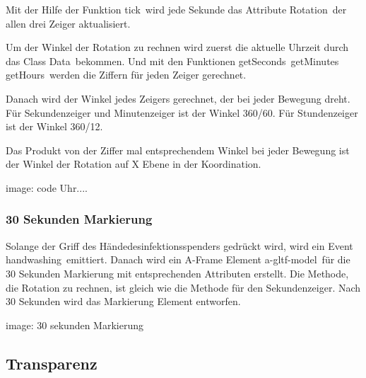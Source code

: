  Mit der Hilfe der Funktion \glqq tick\grqq\ wird jede Sekunde das Attribute \glqq Rotation\grqq\ der allen drei Zeiger aktualisiert. 
 
 Um der Winkel der Rotation zu rechnen wird zuerst die aktuelle Uhrzeit durch das Class \glqq Data\grqq\ bekommen. Und mit den Funktionen \glqq getSeconds\grqq\, \glqq getMinutes\grqq\, \glqq getHours\grqq\ werden die Ziffern für jeden Zeiger gerechnet.
 
 Danach wird der Winkel jedes Zeigers gerechnet, der bei jeder Bewegung dreht. Für Sekundenzeiger und Minutenzeiger ist der Winkel 360/60. Für Stundenzeiger ist der Winkel 360/12.
 
 Das Produkt von der Ziffer mal entsprechendem Winkel bei jeder Bewegung ist der Winkel der Rotation auf X Ebene in der Koordination.
 
 image: code Uhr....
 
 \subsubsection{30 Sekunden Markierung}
 Solange der Griff des Händedesinfektionsspenders gedrückt wird, wird ein Event \glqq handwashing\grqq\ emittiert. Danach wird ein A-Frame Element \glqq a-gltf-model\grqq\ für die 30 Sekunden Markierung mit entsprechenden Attributen  erstellt. Die Methode, die Rotation zu rechnen, ist gleich wie die Methode für den Sekundenzeiger. Nach 30 Sekunden wird das Markierung Element entworfen.
 
 image: 30 sekunden Markierung
 
 
 \subsection{Transparenz}
 

